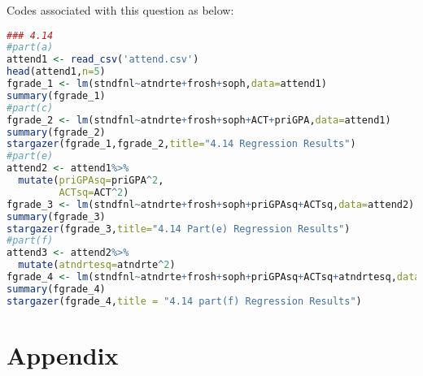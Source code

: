 \documentclass[11pt]{article} %
\begin{document}
Codes associated with this question as below:
\begin{lstlisting}[language=R]
    ### 4.14
#part(a)
attend1 <- read_csv('attend.csv')
head(attend1,n=5)
fgrade_1 <- lm(stndfnl~atndrte+frosh+soph,data=attend1)
summary(fgrade_1)
#part(c)
fgrade_2 <- lm(stndfnl~atndrte+frosh+soph+ACT+priGPA,data=attend1)
summary(fgrade_2)
stargazer(fgrade_1,fgrade_2,title="4.14 Regression Results")
#part(e)
attend2 <- attend1%>%
  mutate(priGPAsq=priGPA^2,
         ACTsq=ACT^2)
fgrade_3 <- lm(stndfnl~atndrte+frosh+soph+priGPAsq+ACTsq,data=attend2)
summary(fgrade_3)
stargazer(fgrade_3,title="4.14 Part(e) Regression Results")
#part(f)
attend3 <- attend2%>%
  mutate(atndrtesq=atndrte^2)
fgrade_4 <- lm(stndfnl~atndrte+frosh+soph+priGPAsq+ACTsq+atndrtesq,data=attend3)
summary(fgrade_4)
stargazer(fgrade_4,title = "4.14 part(f) Regression Results")
\end{lstlisting}







































































\appendix
\setcounter{secnumdepth}{0}
\section{Appendix}
\end{document}
